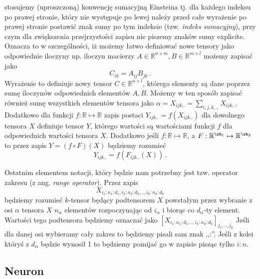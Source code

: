 \documentclass{myclass}
\begin{document}
stosujemy (uproszczoną) konwencję sumacyjną Einsteina tj. dla każdego indeksu po prawej stronie,
który nie występuje po lewej należy przed całe wyrażenie po prawej stronie postawić znak sumy po tym
indeksie (tzw. \textit{indeks sumacyjny}), przy czym dla zwiększenia przejrzystości zapisu nie
piszemy znaków sumy explicite. Oznacza to w szczególności, iż możemy łatwo definiować nowe tensory
jako odpowiednie iloczyny np. iloczyn macierzy \(A \in \mathbb{R}^{n\times m}, B \in
\mathbb{R}^{m\times l}\) możemy zapisać jako
\begin{equation*}
    C_{ik} = A_{ij}B_{jk}\,.
\end{equation*}
Wyrażenie to definiuje nowy tensor \(C \in \mathbb{R}^{n \times l}\), którego elementy są dane
poprzez sumę iloczynów odpowiednich elementów \(A, B\). Możemy w ten sposób zapisać również sumę
wszystkich elementów tensora jako \(\alpha = X_{ijk..} = \sum_{i,j,k,..} X_{ijk..}\). Dodatkowo dla
funkcji \(f: \mathbb{R} \mapsto \mathbb{R}\) zapis postaci \(Y_{ijk..} = f(X_{ijk..})\) dla
dowolnego tensora \(X\) definiuje tensor \(Y\), którego wartości są wartościami funkcji \(f\) dla
odpowiednich wartości tensora \(X\). Dodatkowo jeśli \(f: \mathbb{R} \mapsto \mathbb{R}\), a \(F :
\mathbb{R}^{\sh_1} \mapsto \mathbb{R}^{\sh_2}\) to przez zapis \(Y = (f \circ F)(X)\) będziemy
rozumieć 
\begin{equation*}
    Y_{ijk..} = f(F_{ijk..}(X))\,.
\end{equation*}

Ostatnim elementem notacji, który będzie nam potrzebny jest tzw. operator zakresu (z ang.
\textit{range operator}). Przez zapis 
\begin{equation*} 
    X_{i_1:n_1:d_1, i_2:n_2:d_2,..,i_k:n_k:d_k}
\end{equation*} 
będziemy rozumieć \(k\)-tensor będący podtensorem \(X\) powstałym przez wybranie z osi \(\alpha\)
tensora \(X\) \(n_\alpha\) elementów rozpoczynając od \(i_\alpha\) i biorąc co \(d_\alpha\)-ty
element. Wartości tego podtensora będziemy oznaczać jako
\([X_{i_1:n_1:d_1,..,i_k:n_k:d_k}]_{j_1,..,j_k}\) Jeśli dla danej osi wybieramy cały zakres to
będziemy pisali sam znak ,,:''. Jeśli z kolei któryś z \(d_\alpha\) będzie wynosił 1 to będziemy
pomijać go w zapisie pisząc tylko \(i:n\).

\subsection{Neuron}
\end{document}
